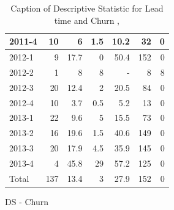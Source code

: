 \documentclass[UKenglish]{ifimaster}  %
\begin{document}
\begin{appendices}
\begin{table}[!htbp]
\begin{adjustwidth}{-2.5cm}{}
\begin{subfigure}[b]{0.7\textwidth}
{\begin{tabular}{ | l | r | r | r | r | r | r | }
 2011-4  & 10 & 6 & 1.5 & 10.2 & 32 & 0\\ \hline
 2012-1  & 9 & 17.7 & 0 &50.4 & 152 & 0\\ \hline
 2012-2  & 1 & 8 & 8 & - & 8 & 8 \\ \hline
 2012-3  & 20 & 12.4 & 2 & 20.5 & 84 & 0\\ \hline
 2012-4  & 10 & 3.7 & 0.5 & 5.2 & 13 & 0\\ \hline
 2013-1  & 22 & 9.6 & 5 & 15.5 & 73 & 0\\ \hline
 2013-2  & 16 & 19.6 & 1.5 & 40.6 & 149 & 0\\ \hline
 2013-3  & 20 & 17.9 & 4.5 & 35.9 & 145 & 0\\ \hline
 2013-4  & 4 & 45.8 & 29 & 57.2 & 125 & 0\\ \hline
 Total  & 137 & 13.4 & 3 & 27.9 & 152 & 0\\ \hline
\end{tabular}
}
\caption{DS - Churn}
 \label{DS:Churn:8}
\end{subfigure}
\end{adjustwidth}
\caption[Optional caption for list of figures]{Caption of Descriptive Statistic for Lead time and Churn  , }
\label{DS:8:3}
\end{table}


\end{appendices}
\end{document}
